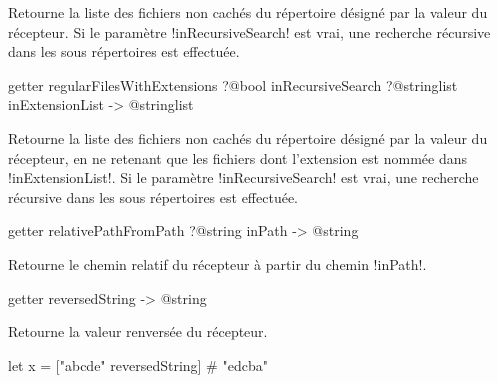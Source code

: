 Retourne la liste des fichiers non cachés du répertoire désigné par la valeur du récepteur. Si le paramètre \ggs!inRecursiveSearch! est vrai, une recherche récursive dans les sous répertoires est effectuée.










\begin{galgasbox}
getter regularFilesWithExtensions
    ?@bool inRecursiveSearch
    ?@stringlist inExtensionList -> @stringlist
\end{galgasbox}

Retourne la liste des fichiers non cachés du répertoire désigné par la valeur du récepteur, en ne retenant que les fichiers dont l'extension est nommée dans \ggs!inExtensionList!. Si le paramètre \ggs!inRecursiveSearch! est vrai, une recherche récursive dans les sous répertoires est effectuée.










\begin{galgasbox}
getter relativePathFromPath ?@string inPath -> @string
\end{galgasbox}

Retourne le chemin relatif du récepteur à partir du chemin \ggs!inPath!.










\begin{galgasbox}
getter reversedString -> @string
\end{galgasbox}

Retourne la valeur renversée du récepteur.

\begin{galgas}
let x = ["abcde" reversedString] # "edcba"
\end{galgas}










